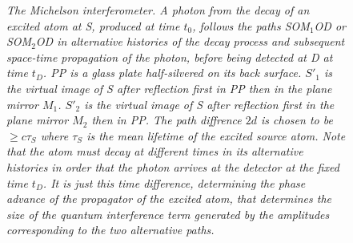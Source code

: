 \documentclass [12pt]{article}
\begin{document}
{\begin{figure}[htbp]
\begin{center}
\caption{{\sl The Michelson interferometer. A photon from the decay of an excited
  atom at S, produced at time $t_0$, follows the paths SOM$_1$OD or  SOM$_2$OD in alternative histories of the decay
  process and subsequent space-time propagation of the photon, before being detected at D at time $t_D$. PP
   is a glass plate half-silvered on its back surface. $S'_1$ is the virtual image of S after reflection 
   first in PP then in the plane mirror $M_1$.  $S'_2$ is the virtual image of S after reflection 
   first in the plane mirror $M_2$ then in  PP. The path diffrence $2d$ is chosen to be $\geq c \tau_S$ where 
   $\tau_S$ is the mean lifetime of the excited source atom. Note that the atom must decay 
    at different times in its alternative histories in order that the photon arrives at the 
   detector at the fixed time $t_D$. It is just this time difference, determining the phase advance 
   of the propagator of the excited atom, that determines the size of the quantum interference
   term generated by the amplitudes corresponding to the two alternative paths. }} 
\label{fig-fig8}
\end{center}
\end{figure}

}
\end{document}
